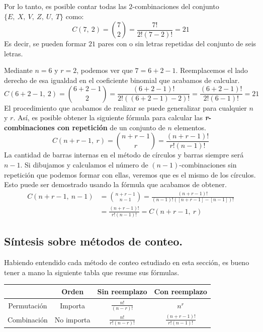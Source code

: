 \documentclass[12pt]{article}
\begin{document}
Por lo tanto, es posible contar todas las $2$-combinaciones del conjunto $\{E, \ X, \ V, \ Z, \ U, \ T\}$ como:
\[
  C(7, \ 2) = \binom{7}{2} = \frac{7!}{2! (7 - 2)!} = 21
\]
Es decir, se pueden formar $21$ pares con o sin letras repetidas del conjunto de seis letras.

Mediante $n = 6$ y $r = 2$, podemos ver que $7 = 6 + 2 - 1$. Reemplacemos el lado derecho de esa igualdad en el coeficiente binomial que acabamos de calcular.
\[
  C(6 + 2 - 1, \ 2) = \binom{6 + 2 - 1}{2}
                    = \frac{(6 + 2 - 1)!}{2! ((6 + 2 - 1) - 2)!}
                    = \frac{(6 + 2 - 1)!}{2! (6 - 1)!}
                    = 21
\]
El procedimiento que acabamos de realizar se puede generalizar para cualquier $n$ y $r$. Así, es posible obtener la siguiente fórmula para calcular las \textbf{\textit{r}-combinaciones con repetición} de un conjunto de $n$ elementos.
\[
  C(n + r - 1, \ r) = \binom{n + r - 1}{r} = \frac{(n + r - 1)!}{r!(n - 1)!}
\]
La cantidad de barras internas en el método de círculos y barras siempre será $n - 1$. Si dibujamos y calculamos el número de $(n - 1)$-combinaciones sin repetición que podemos formar con ellas, veremos que es el mismo de los círculos. Esto puede ser demostrado usando la fórmula que acabamos de obtener.
\begin{align*}
  C(n + r - 1, \ n - 1) &= \binom{n + r - 1}{n - 1}
                        = \frac{(n + r - 1)!}{(n - 1)!([n + r - 1] - [n - 1])!} \\
                        &= \frac{(n + r - 1)!}{r!(n - 1)!}
                        = C(n + r - 1, \ r)
\end{align*}

\subsection{Síntesis sobre métodos de conteo.}

Habiendo entendido cada método de conteo estudiado en esta sección, es bueno tener a mano la siguiente tabla que resume sus fórmulas.

\begin{table}[hbt!]
\centering
\renewcommand{\arraystretch}{1.7}

\begin{tabular}{c|c c c}
            & Orden & Sin reemplazo & Con reemplazo \\
\hline
Permutación & Importa & $\displaystyle \frac{n!}{(n - r)!}$ & $n^{r}$ \\
Combinación & No importa & $\displaystyle \frac{n!}{r!(n - r)!}$ & $\displaystyle \frac{(n + r - 1)!}{r!(n - 1)!}$
\end{tabular}

\end{table}
\end{document}
